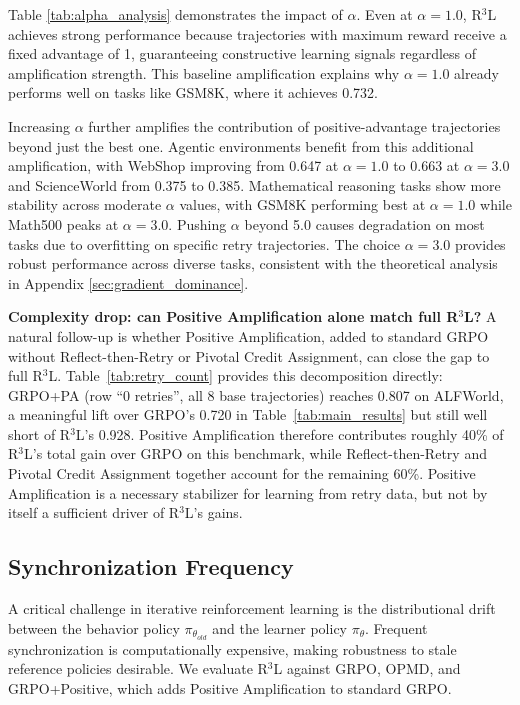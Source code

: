 \documentclass[11pt]{article}
\theoremstyle{definition}
\theoremstyle{remark}
\begin{document}


Table \ref{tab:alpha_analysis} demonstrates the impact of $\alpha$. Even at $\alpha=1.0$, R$^3$L achieves strong performance because trajectories with maximum reward receive a fixed advantage of 1, guaranteeing constructive learning signals regardless of amplification strength. This baseline amplification explains why $\alpha=1.0$ already performs well on tasks like GSM8K, where it achieves 0.732. 

Increasing $\alpha$ further amplifies the contribution of positive-advantage trajectories beyond just the best one. Agentic environments benefit from this additional amplification, with WebShop improving from 0.647 at $\alpha=1.0$ to 0.663 at $\alpha=3.0$ and ScienceWorld from 0.375 to 0.385. Mathematical reasoning tasks show more stability across moderate $\alpha$ values, with GSM8K performing best at $\alpha=1.0$ while Math500 peaks at $\alpha=3.0$. Pushing $\alpha$ beyond 5.0 causes degradation on most tasks due to overfitting on specific retry trajectories. The choice $\alpha=3.0$ provides robust performance across diverse tasks, consistent with the theoretical analysis in Appendix \ref{sec:gradient_dominance}.

\textbf{Complexity drop: can Positive Amplification alone match full R$^3$L?} A natural follow-up is whether Positive Amplification, added to standard GRPO without Reflect-then-Retry or Pivotal Credit Assignment, can close the gap to full R$^3$L. Table~\ref{tab:retry_count} provides this decomposition directly: GRPO+PA (row ``0 retries'', all 8 base trajectories) reaches 0.807 on ALFWorld, a meaningful lift over GRPO's 0.720 in Table~\ref{tab:main_results} but still well short of R$^3$L's 0.928. Positive Amplification therefore contributes roughly 40\% of R$^3$L's total gain over GRPO on this benchmark, while Reflect-then-Retry and Pivotal Credit Assignment together account for the remaining 60\%. Positive Amplification is a necessary stabilizer for learning from retry data, but not by itself a sufficient driver of R$^3$L's gains.

\subsection{Synchronization Frequency}
A critical challenge in iterative reinforcement learning is the distributional drift between the behavior policy $\pi_{\theta_{old}}$ and the learner policy $\pi_{\theta}$. Frequent synchronization is computationally expensive, making robustness to stale reference policies desirable. We evaluate R$^3$L against GRPO, OPMD, and GRPO+Positive, which adds Positive Amplification to standard GRPO.
\end{document}
